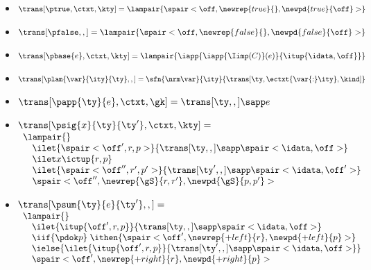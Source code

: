 \begin{figure}
\small
{} 

\begin{itemize}
\renewcommand{\labelitemi}{}
\item $\trans[\ptrue,\ctxt,\kty] =
  \lampair{\spair<\off,\newrep{true}{},\newpd{true}{\off}>}$

\item $\trans[\pfalse,,] =
  \lampair{\spair<\off,\newrep {false}{},\newpd {false}{\off}>}$

\item $\trans[\pbase{e},\ctxt,\kty] =
  \lampair{\iapp {\iapp {\Iimp(C)} (e)} {\itup {\idata,\off}}}$

\item $\trans[\plam{\var}{\ity}{\ty},,] =
   \sfn{\nrm\var}{\ity}{\trans[\ty,\ectxt{\var{:}\ity},\kind]}$

\item $\trans[\papp{\ty}{e},\ctxt,\gk] =
  \trans[\ty,,] \sapp e$

\item $\trans[\psig{x}{\ty}{\ty'},\ctxt,\kty] =$ \\
  $\begin{array}{l}  
    \lampair{} \\
    \quad  \ilet {\spair<\off',r,p>} 
    {{\trans[\ty,,]} \sapp \spair<\idata,\off>} \\
    \quad  \ilet x {\ictup{r,p}}\\
    \quad  \ilet {\spair<\off'',r',p'>} 
    {{\trans[\ty',,]} \sapp \spair<\idata,\off'>} \\
    \quad \spair<\off'',\newrep {\gS}{r,r'},\newpd {\gS}{p,p'}>
  \end{array}$

\item $\trans[\psum{\ty}{e}{\ty'},,] =$ \\
  $\begin{array}{l}  
  \lampair{} \\
  \quad \ilet {\itup{\off',r,p}}{\trans[\ty,,] \sapp \spair<\idata,\off>} \\
  \quad \iif {\pdok p} \; \ithen {
    \def \r {\newrep {+left}{r}}
    \def \p {\newpd {+left}{p}}
    \spair<\off',\r,\p>} \\
  \quad \ielse {\ilet {\itup{\off',r,p}}{\trans[\ty',,] \sapp \spair<\idata,\off>}} \\
  \quad 
  {  %
    \def \r {\newrep {+right}{r}}
    \def \p {\newpd {+right}{p}}
    \spair<\off',\r,\p>
  }\\ %
  \end{array}$


\end{itemize}
\end{figure}
